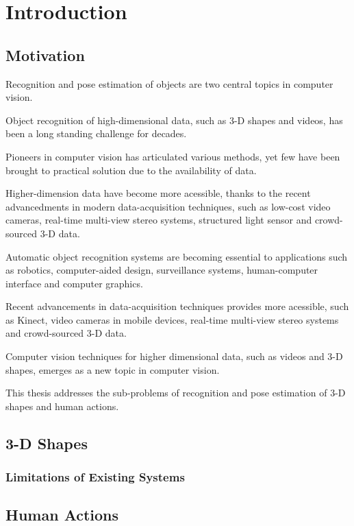 \chapter{Introduction}
\label{chap/intro}

\section{Motivation} 

Recognition and pose estimation of objects are two central topics in computer vision. 


Object recognition of high-dimensional data, such as 3-D shapes and videos, has been a long standing challenge for decades.  

Pioneers in computer vision has articulated various methods, yet few have been brought to practical solution due to the availability of data. 

Higher-dimension data have become more acessible, thanks to the recent advancedments in modern data-acquisition techniques, such as low-cost video cameras, real-time multi-view stereo systems, structured light sensor and crowd-sourced 3-D data. 

Automatic object recognition systems are becoming essential to applications such as robotics, computer-aided design, surveillance systems, human-computer interface and computer graphics.  

Recent advancements in data-acquisition techniques provides more acessible, such as Kinect, video cameras in mobile devices, real-time multi-view stereo systems and crowd-sourced 3-D data.  

Computer vision techniques for higher dimensional data, such as videos and 3-D shapes, emerges as a new topic in computer vision.  

This thesis addresses the sub-problems of recognition and pose estimation of 3-D shapes and human actions. 

\section{3-D Shapes}
\subsection{Limitations of Existing Systems}

\section{Human Actions}
